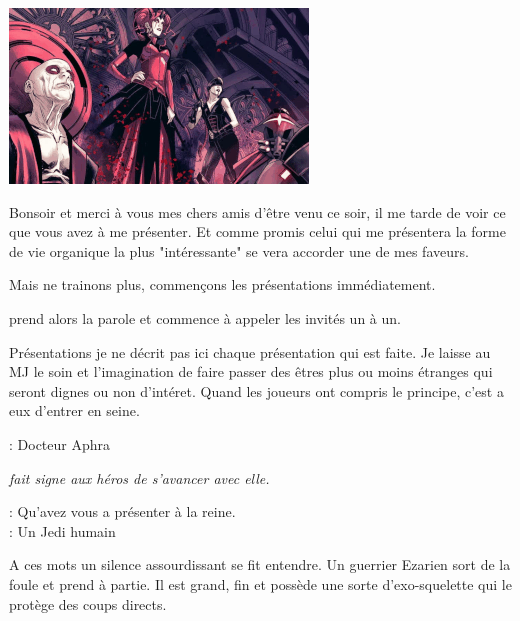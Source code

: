 \noindent\includegraphics[width=\linewidth]{_img/places/queen-with-minions.png}

\begin{quotebox}
Bonsoir et merci à vous mes chers amis d’être venu ce soir, il me tarde de voir ce que vous avez à me présenter. Et comme promis celui qui me présentera la forme de vie organique la plus "intéressante" se vera accorder une de mes faveurs.

Mais ne trainons plus, commençons les présentations immédiatement.
\end{quotebox}

 prend alors la parole et commence à appeler les invités un à un.

\begin{paperbox}{Présentations}
je ne décrit pas ici chaque présentation qui est faite. Je laisse au MJ le soin et l’imagination de faire passer des êtres plus ou moins étranges qui seront dignes ou non d’intéret. Quand les joueurs ont compris le principe, c’est a eux d’entrer en seine.
\end{paperbox}

\begin{quotebox}
\noindent\textbf{}: Docteur Aphra

\emph{ fait signe aux héros de s’avancer avec elle.}

\noindent\textbf{}: Qu’avez vous a présenter à la reine.\\
\noindent\textbf{}: Un Jedi humain
\end{quotebox}

A ces mots un silence assourdissant se fit entendre. Un guerrier Ezarien sort de la foule et prend  à partie. Il est grand, fin et possède une sorte d’exo-squelette qui le protège des coups directs.

